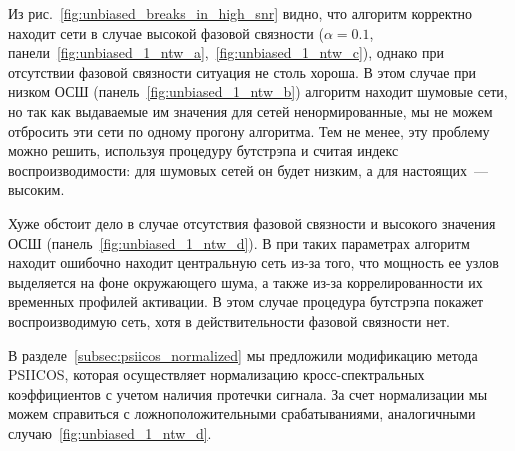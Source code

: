 Из рис.~\ref{fig:unbiased_breaks_in_high_snr} видно, что алгоритм корректно находит
сети в случае высокой фазовой связности ($\alpha=0.1$, панели~\ref{fig:unbiased_1_ntw_a},~\ref{fig:unbiased_1_ntw_c}), однако при отсутствии фазовой связности ситуация не столь хороша.
В этом случае при низком ОСШ (панель~\ref{fig:unbiased_1_ntw_b}) алгоритм находит
шумовые сети, но так как выдаваемые им значения для сетей ненормированные, мы не можем
отбросить эти сети по одному прогону алгоритма. Тем не менее, эту проблему можно
решить, используя процедуру бутстрэпа и считая индекс воспроизводимости: для шумовых сетей
он будет низким, а для настоящих~--- высоким.

Хуже обстоит дело в случае отсутствия фазовой связности и высокого значения ОСШ (панель~\ref{fig:unbiased_1_ntw_d}). В при таких параметрах алгоритм находит ошибочно находит центральную сеть
из-за того, что мощность ее узлов выделяется на фоне окружающего шума, а также из-за
коррелированности их временных профилей активации. В этом случае процедура бутстрэпа
покажет воспроизводимую сеть, хотя в действительности фазовой связности нет.

В разделе~\ref{subsec:psiicos_normalized} мы предложили
модификацию метода PSIICOS, которая осуществляет нормализацию кросс-спектральных
коэффициентов с учетом наличия протечки сигнала. За счет нормализации мы можем справиться
с ложноположительными срабатываниями, аналогичными случаю~\ref{fig:unbiased_1_ntw_d}.


